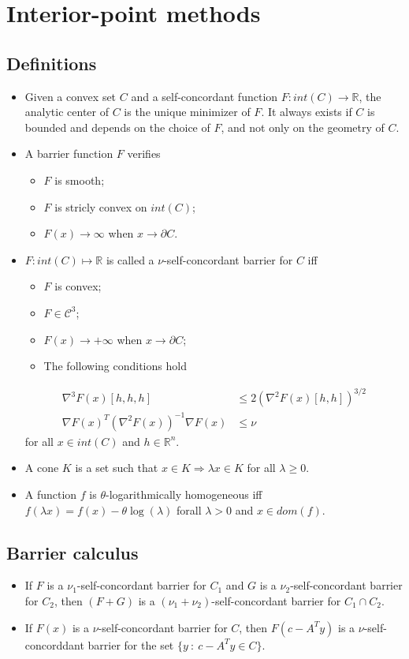 \documentclass[12pt, openany]{report}
\newcommand{\R}{\mathbb{R}}
\theoremstyle{definition}
\begin{document}
\section{Interior-point methods}
\subsection{Definitions}
\begin{itemize}
    \item Given a convex set $C$ and a self-concordant function $F:int(C)\rightarrow \R$, the analytic center of $C$ is the unique minimizer of $F$. It always exists if $C$ is bounded and depends on the choice of $F$, and not only on the geometry of $C$. 
    \item A barrier function $F$ verifies
    \begin{itemize}
        \item $F$ is smooth;
        \item $F$ is stricly convex on $int(C)$;
        \item $F(x)\rightarrow \infty$ when $x\rightarrow \partial C$.
    \end{itemize}
    \item $F:int(C)\mapsto \R$ is called a $\nu$-self-concordant barrier for $C$ iff 
    \begin{itemize}
        \item $F$ is convex;
        \item $F\in \mathcal{C}^3$;
        \item $F(x)\rightarrow +\infty$ when $x\rightarrow \partial C$;
        \item The following conditions hold 
    \end{itemize}
    \begin{align} 
        \nabla^3 F(x)[h,h,h]&\le 2\left(\nabla^2 F(x)[h,h]\right)^{3/2}\\
        \nabla F(x)^T \left(\nabla^2F(x)\right)^{-1}\nabla F(x)&\le \nu 
    \end{align} 
    for all $x\in int(C)$ and $h\in \R^n$.
    \item A cone $K$ is a set such that $x\in K\Longrightarrow \lambda x\in K$ for all $\lambda\ge 0$. 
    \item A function $f$ is $\theta$-logarithmically homogeneous iff $f(\lambda x)=f(x)-\theta\log(\lambda)$ forall $\lambda >0$ and $x\in dom(f)$.
\end{itemize}
\subsection{Barrier calculus}
\begin{itemize}
    \item If $F$ is a $\nu_1$-self-concordant barrier for $C_1$ and $G$ is a $\nu_2$-self-concordant barrier for $C_2$, then $(F+G)$ is a $(\nu_1+\nu_2)$-self-concordant barrier for $C_1\cap C_2$.
    \item If $F(x)$ is a $\nu$-self-concordant barrier for $C$, then $F(c-A^Ty)$ is a $\nu$-self-concorddant barrier for the set $\{y\: : \: c-A^Ty\in C\}$. 
\end{itemize}
\end{document}
